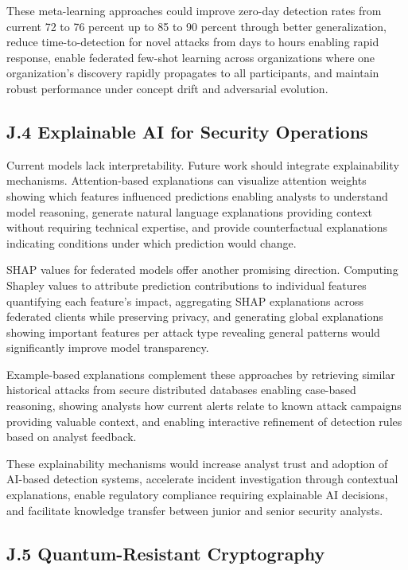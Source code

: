 \documentclass[12pt,a4paper]{article}
\theoremstyle{definition}
\begin{document}
These meta-learning approaches could improve zero-day detection rates from current 72 to 76 percent up to 85 to 90 percent through better generalization, reduce time-to-detection for novel attacks from days to hours enabling rapid response, enable federated few-shot learning across organizations where one organization's discovery rapidly propagates to all participants, and maintain robust performance under concept drift and adversarial evolution.

\subsection{J.4 Explainable AI for Security Operations}

Current models lack interpretability. Future work should integrate explainability mechanisms. Attention-based explanations can visualize attention weights showing which features influenced predictions enabling analysts to understand model reasoning, generate natural language explanations providing context without requiring technical expertise, and provide counterfactual explanations indicating conditions under which prediction would change.

SHAP values for federated models offer another promising direction. Computing Shapley values to attribute prediction contributions to individual features quantifying each feature's impact, aggregating SHAP explanations across federated clients while preserving privacy, and generating global explanations showing important features per attack type revealing general patterns would significantly improve model transparency.

Example-based explanations complement these approaches by retrieving similar historical attacks from secure distributed databases enabling case-based reasoning, showing analysts how current alerts relate to known attack campaigns providing valuable context, and enabling interactive refinement of detection rules based on analyst feedback.

These explainability mechanisms would increase analyst trust and adoption of AI-based detection systems, accelerate incident investigation through contextual explanations, enable regulatory compliance requiring explainable AI decisions, and facilitate knowledge transfer between junior and senior security analysts.

\subsection{J.5 Quantum-Resistant Cryptography}
\end{document}
